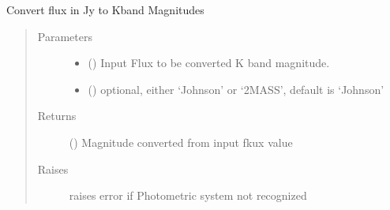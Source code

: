 \documentclass[a4paper,11pt,english]{sphinxmanual}
\begin{document}

\begin{fulllineitems}
\label{\detokenize{cascade.exoplanet_tools:cascade.exoplanet_tools.exoplanet_tools.JytoKmag}}
Convert flux in Jy to Kband Magnitudes
\begin{quote}\begin{description}
\item[{Parameters}] \leavevmode\begin{itemize}
\item {} 
 (\sphinxstyleliteralemphasis{\sphinxupquote{, }}) \textendash{} Input Flux to be converted K band magnitude.

\item {} 
 () \textendash{} optional, either ‘Johnson’ or ‘2MASS’, default is ‘Johnson’

\end{itemize}

\item[{Returns}] \leavevmode
{} () \textendash{} Magnitude  converted from input fkux value

\item[{Raises}] \leavevmode
{} \textendash{} raises error if Photometric system not recognized

\end{description}\end{quote}

\end{fulllineitems}

\end{document}
